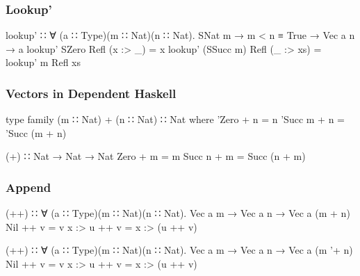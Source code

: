 \documentclass{beamer}
\begin{document}
\begin{frame}[fragile]\frametitle{Lookup'}
\begin{semiverbatim}
lookup' ∷ ∀ (a ∷ Type)(m ∷ Nat)(n ∷ Nat).
           SNat m → m < n ≡ True → Vec a n → a
lookup' SZero     Refl (x :> _)  = x
lookup' (SSucc m) Refl (_ :> xs) = lookup' m Refl xs
\end{semiverbatim}
\end{frame}


% 

\begin{frame}[fragile]\frametitle{Vectors in Dependent Haskell}
\begin{semiverbatim}
type family (m ∷ Nat) + (n ∷ Nat) ∷ Nat where
  'Zero   + n = n
  'Succ m + n = 'Succ (m + n)

(+) ∷ Nat → Nat → Nat
Zero   + m = m
Succ n + m = Succ (n + m)
\end{semiverbatim}
\end{frame}

\begin{frame}[fragile]\frametitle{Append}
\begin{semiverbatim}
(++) ∷ ∀ (a ∷ Type)(m ∷ Nat)(n ∷ Nat).
       Vec a m → Vec a n → Vec a (m + n)
Nil    ++ v = v
x :> u ++ v = x :> (u ++ v)

(++) ∷ ∀ (a ∷ Type)(m ∷ Nat)(n ∷ Nat).
       Vec a m → Vec a n → Vec a (m '+ n)
Nil    ++ v = v
x :> u ++ v = x :> (u ++ v)
\end{semiverbatim}
\end{frame}
\end{document}
